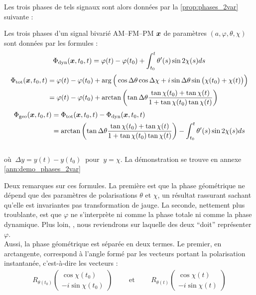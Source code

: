 Les trois phases de tels signaux sont alors données par la \cref{prop:phases_2var} suivante :
\begin{proposition}\label{prop:phases_2var}
	Les trois phases d'un signal bivarié AM--FM--PM $\boldsymbol{x}$ de paramètres $(a,\varphi,\theta,\chi)$ sont données par les formules :
	\begin{equation}\label{eq:phased_2var}
		\Phi_{\text{\normalfont dyn}}(\boldsymbol{x}, t_0,t) = \varphi(t) -\varphi(t_0) + \int_{t_0}^t\theta'(s) \sin2\chi(s) ds
	\end{equation}
	\begin{equation}\label{eq:phaset_2var}
	\begin{aligned}
		\Phi_{\text{\normalfont tot}}(\boldsymbol{x},t_0,t) &= \varphi(t)-\varphi(t_0) + \arg\Big(\cos\Delta\theta \cos\Delta\chi + i\sin\Delta\theta \sin\big(\chi(t_0)+\chi(t)\big)\Big) \\
		&= \varphi(t)-\varphi(t_0) + \arctan\left(\tan\Delta\theta \frac{ \tan\chi(t_0)+\tan\chi(t)}{1 + \tan\chi(t_0)\tan\chi(t)}\right)
	\end{aligned}
	\end{equation}
	\begin{equation}\label{eq:phaseg_2var}
	\begin{aligned}
		\Phi_{\text{\normalfont geo}}(\boldsymbol{x},t_0,t) &= \Phi_{\text{\normalfont tot}}(\boldsymbol{x},t_0,t) - \Phi_{\text{\normalfont dyn}}(\boldsymbol{x},t_0,t) \\
			&= \arctan\left(\tan\Delta\theta \frac{ \tan\chi(t_0)+\tan\chi(t)}{1 + \tan\chi(t_0)\tan\chi(t)}\right) - \int_{t_0}^t\theta'(s) \sin2\chi(s) ds
	\end{aligned}
	\end{equation}
	\\
	où $\ \Delta y = y(t) - y(t_0)\ $ pour $\ y = \chi$. La démonstration se trouve en annexe \ref{ann:demo_phases_2var}
\end{proposition}
\skipl

Deux remarques sur ces formules. 
La première est que la phase géométrique ne dépend que des paramètres de polarisations $\theta$ et $\chi$, un résultat rassurant sachant qu'elle est invariantes pas transformation de jauge.
La seconde, nettement plus troublante, est que $\varphi$ ne s'interprète ni comme la phase totale ni comme la phase dynamique. Plus loin, , nous reviendrons sur laquelle des deux ``doit'' représenter $\varphi$.
\\

Aussi, la phase géométrique est séparée en deux termes. Le premier, en arctangente, correspond à l'angle formé par les vecteurs portant la polarisation instantanée, c'est-à-dire les vecteurs :
\begin{align*}
	R_{\theta(t_0)} \begin{pmatrix} \cos\chi(t_0) \\ -i\sin\chi(t_0) \end{pmatrix}\qquad \text{ et }\qquad R_{\theta(t)} \begin{pmatrix} \cos\chi(t) \\ -i\sin\chi(t) \end{pmatrix}
\end{align*}
\\

